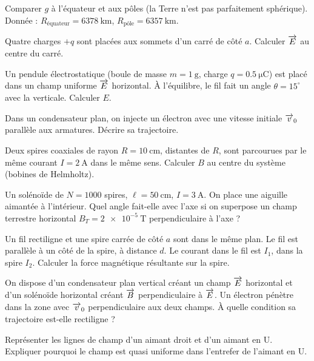 \exo{} Comparer $g$ à l’équateur et aux pôles (la Terre n’est pas parfaitement sphérique). Donnée : $R_{\text{équateur}} = \SI{6378}{\kilo\metre}$, $R_{\text{pôle}} = \SI{6357}{\kilo\metre}$.


\exo{} Quatre charges $+q$ sont placées aux sommets d’un carré de côté $a$. Calculer $\overrightarrow{E}$ au centre du carré.

\exo{} Un pendule électrostatique (boule de masse $m = \SI{1}{\gram}$, charge $q = \SI{0.5}{\micro\coulomb}$) est placé dans un champ uniforme $\overrightarrow{E}$ horizontal. À l’équilibre, le fil fait un angle $\theta = 15^\circ$ avec la verticale. Calculer $E$.

\exo{} Dans un condensateur plan, on injecte un électron avec une vitesse initiale $\overrightarrow{v}_0$ parallèle aux armatures. Décrire sa trajectoire.


\exo{} Deux spires coaxiales de rayon $R = \SI{10}{\centi\metre}$, distantes de $R$, sont parcourues par le même courant $I = \SI{2}{\ampere}$ dans le même sens. Calculer $B$ au centre du système (bobines de Helmholtz).

\exo{} Un solénoïde de $N = 1000$ spires, $\ell = \SI{50}{\centi\metre}$, $I = \SI{3}{\ampere}$. On place une aiguille aimantée à l’intérieur. Quel angle fait-elle avec l’axe si on superpose un champ terrestre horizontal $B_T = \SI{2e-5}{\tesla}$ perpendiculaire à l’axe ?

\exo{} Un fil rectiligne et une spire carrée de côté $a$ sont dans le même plan. Le fil est parallèle à un côté de la spire, à distance $d$. Le courant dans le fil est $I_1$, dans la spire $I_2$. Calculer la force magnétique résultante sur la spire.


\exo{} On dispose d’un condensateur plan vertical créant un champ $\overrightarrow{E}$ horizontal et d’un solénoïde horizontal créant $\overrightarrow{B}$ perpendiculaire à $\overrightarrow{E}$. Un électron pénètre dans la zone avec $\overrightarrow{v}_0$ perpendiculaire aux deux champs. À quelle condition sa trajectoire est-elle rectiligne ?

\exo{} Représenter les lignes de champ d’un aimant droit et d’un aimant en U. Expliquer pourquoi le champ est quasi uniforme dans l’entrefer de l’aimant en U.

